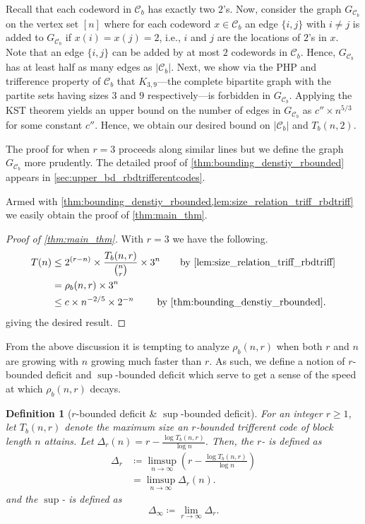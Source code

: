 \documentclass[10pt,a4paper]{article}
\newcommand{\rbdtrifferentcodes}{$r$-bounded trifferent code}
\newcommand{\boundeddeficit}{$r$-bounded deficit}
\newcommand{\limitingdeficit}{$\sup$-bounded deficit}
\newcommand{\calC}{\mathcal{C}}
\newcommand{\define}[1]{\textsb{#1}}
\newcommand{\set}[1]{\{#1\}}
\newtheorem{definition}{Definition}[section]
\DeclareMathOperator{\1}{\mathbf{1}}
\begin{document}
Recall that each codeword in $\calC_b$ has exactly two $2$'s.
Now, consider the graph $G_{\calC_b}$ on the vertex set $[n]$ where for each codeword $x\in \calC_b$ an edge $\set{i,j}$ with $i\neq j$ is added to $G_{\calC_b}$ if $x(i)=x(j)=2$, i.e., $i$ and $j$ are the locations of $2$'s in $x$. Note that an edge $\set{i,j}$ can be added by at most $2$ codewords in $\calC_b$.
Hence, $G_{\calC_b}$ has at least half as many edges as $|\calC_b|$.
Next, we show via the PHP and trifference property of $\calC_b$ that $K_{3,9}$---the complete bipartite graph with the partite sets having sizes $3$ and $9$ respectively---is forbidden in $G_{\calC_b}$.
Applying the KST theorem yields an upper bound on the number of edges in $G_{\calC_b}$ as $c''\times n^{5/3}$ for some constant $c''$.
Hence, we obtain our desired bound on $|\calC_b|$ and $T_b(n,2)$.

The proof for when $r=3$ proceeds along similar lines but we define the graph $G_{\calC_b}$ more prudently.
The detailed proof of \cref{thm:bounding_denstiy_rbounded} appears in \cref{sec:upper_bd_rbdtrifferentcodes}.

Armed with \cref{thm:bounding_denstiy_rbounded,lem:size_relation_triff_rbdtriff} we easily obtain the proof of \cref{thm:main_thm}.

\begin{proof}[Proof of \cref{thm:main_thm}]
	With $r=3$ we have the following.
	\begin{align*}
		T(n)&\leq 2^{(r-n)} \times \frac{T_b(n,r)}{\binom{n}{r}} \times 3^n \qquad \text{by \cref{lem:size_relation_triff_rbdtriff}}\\
		& = \rho_b(n,r) \times 3^n \\
		& \leq c\times n^{-2/5}\times 2^{-n} \qquad \text{ by \cref{thm:bounding_denstiy_rbounded}.}
	\end{align*}
    giving the desired result.
\end{proof}


From the above discussion it is tempting to analyze $\rho_b(n,r)$ when both $r$ and $n$ are growing with $n$ growing much faster than $r$. As such, we define a notion of \boundeddeficit{} and \limitingdeficit{} which serve to get a sense of the speed at which $\rho_b(n,r)$ decays.

\begin{definition}[\boundeddeficit{} \& ${\sup}$-{bounded deficit}]
	For an integer $r\geq 1$, let $T_b(n,r)$ denote the maximum size an \rbdtrifferentcodes{} of block length $n$ attains. Let $\Delta_r(n) = r-\frac{\log{T_b(n,r)}}{\log{n}}$. Then, the ${r}$-\define{bounded deficit} is defined as
	\begin{align*}
	    \Delta_r&\coloneqq\limsup_{n\to \infty}\left(r-\frac{\log{T_b(n,r)}}{\log{n}}\right)\\
        &= \limsup_{n\to \infty} \Delta_r(n).
	\end{align*}
and the ${\sup}$-\define{bounded deficit} is defined as
	$$
		\Delta_\infty\coloneqq\lim_{r\to \infty}\Delta_r.
	$$ 
\end{definition}
\end{document}
